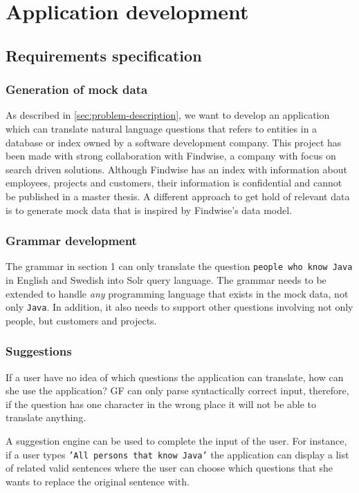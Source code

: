 \chapter{Application development}\label{ch:application-overview}

\section{Requirements specification}

\subsection{Generation of mock data}
As described in \autoref{sec:problem-description}, we want to develop an application which can translate natural language questions that refers to entities in a database or index owned by a software development company. This project has been made with strong collaboration with Findwise, a company with focus on search driven solutions. Although Findwise has an index with information about employees, projects and customers, their information is confidential and cannot be published in a master thesis. A different approach to get hold of relevant data is to generate mock data that is inspired by Findwise's data model.

\subsection{Grammar development}
The grammar in section 1 can only translate the question \texttt{people who know Java} in English and Swedish into Solr query language. The grammar needs to be extended to handle \emph{any} programming language that exists in the mock data, not only \texttt{Java}. In addition, it also needs to support other questions involving not only people, but customers and projects.

\subsection{Suggestions}
If a user have no idea of which questions the application can translate, how can she use the application? GF can only parse syntactically correct input, therefore, if the question has one character in the wrong place it will not be able to translate anything.

A suggestion engine can be used to complete the input of the user. For instance, if a user types \texttt{'All persons that know Java'} the application can display a list of related valid sentences where the user can choose which questions that she wants to replace the original sentence with.

